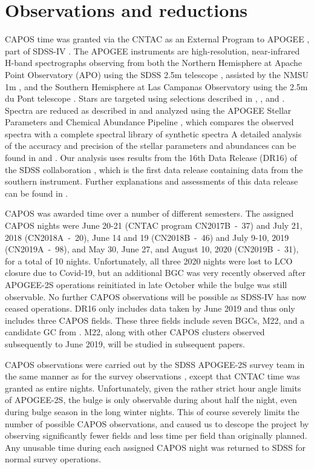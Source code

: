 \documentclass[onecolumn]{aa}
\begin{document}
\section{Observations and reductions}

CAPOS time was granted via the CNTAC as an External Program to APOGEE \citep{Majewski2017}, part of SDSS-IV \citep{Blanton2017}. The APOGEE instruments are high-resolution,
near-infrared H-band spectrographs \citep{Wilson2019} observing from both the Northern Hemisphere at Apache Point Observatory (APO) using the SDSS 2.5m telescope \citep{Gunn2006}, assisted by the NMSU 1m \citep{Holtzman2010}, and the Southern Hemisphere at Las Campanas Observatory using the 2.5m du Pont telescope \citep{Bowen1973}. Stars are targeted using selections described in \citet{Zasowski2013}, \citet{Zasowski2017}, \citet{Santana2021} and \citet{Beaton2021}.
Spectra are reduced as described in \citet{Nidever2015} and analyzed using the APOGEE Stellar Parameters and Chemical Abundance Pipeline \citep[ASPCAP,][]{GarciaPerez2016}, which compares the observed spectra with a  
complete spectral library of synthetic spectra \citep[e.g.,][]{Zamora2015}
A detailed analysis of the
accuracy and precision of the stellar parameters and abundances can be found in \citet{Holtzman2018} and \citet{Henrik2018}. Our analysis uses results from the 16th Data Release (DR16) of the SDSS collaboration \citep{DR16},
which is the first data release containing
data from the southern instrument. Further explanations and assessments of this data release can be found in \citet{Henrik2020}.

CAPOS was awarded time
over a number of different semesters. The assigned CAPOS nights were
June 20-21 (CNTAC program CN2017B~-~37) and July 21, 2018 (CN2018A~-~20), June 14 and 19 (CN2018B~-~46) and July 9-10, 2019 (CN2019A~-~98), and May 30, June 27, and August 10, 2020 (CN2019B~-~31), for a total of 10 nights. Unfortunately, all three 2020 nights were lost to LCO closure due to Covid-19, but an additional BGC was very recently observed after APOGEE-2S operations reinitiated in late October while the bulge was still observable.
No further CAPOS observations will be possible as SDSS-IV has now ceased operations. 
DR16 only includes data taken by June 2019 and thus only includes three CAPOS fields. These three fields include seven BGCs, M22, and a candidate GC from \citet{Minniti2017a}. M22, along with other CAPOS clusters observed subsequently to June 2019,  will be studied in subsequent papers.

CAPOS observations were carried out by the SDSS APOGEE-2S survey team in the same manner as for the survey observations \citep[see][for details]{DR16}, except that CNTAC time was granted as entire nights. Unfortunately, given the rather strict hour angle limits of APOGEE-2S, the bulge is only observable during about half the night, even during bulge season in the long winter nights. This of course severely limits the number of possible CAPOS observations, and caused us to descope the project by observing significantly fewer fields and less time per field than originally planned. Any unusable time during each assigned CAPOS night was returned to SDSS for normal survey operations. 
\end{document}
